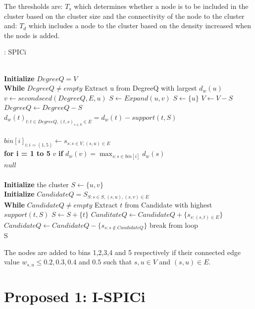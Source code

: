 \documentclass[10pt]{extarticle}
\begin{document}
	The thresholds are: $T_s$ which determines whether a node is to be included in the cluster based on the cluster size and the connectivity of the node to the cluster and: $T_d$ which includes a node to the cluster based on the density increased when the node is added.
	\begin{algorithm}
		\caption{: SPICi}\label{spicicode}
		\begin{algorithmic}[1]
			 \\
			\textbf{Initialize} $DegreeQ = V$ \\
			\textbf{While} $DegreeQ \neq empty$
			\State Extract u from DegreeQ with largest $d_w(u)$
			\State $v \gets secondseed(DegreeQ,E,u)$
			 $S \gets Expand(u,v)$
			\EndIf
			\Else 
			\State $S \gets \{u\}$
			\EndIf
			\State $V \gets V - S $
			\State $Degree Q \gets Degree Q - S$
			\State $d_w(t)_{t:t\in DegreeQ,(t,s)_{s\in S}\in E} = d_w(t) - support(t,S)$
			\EndProcedure\\
			 \\
			$bin[i]_{i:i=(1,5)} \gets s_{s:s\in V,(s,u)\in E}$ \\
			\textbf{for i = 1 to 5}
			\State \Return $v$ \textbf{if} $d_w(v)=\max_{s:s\in bin[i]}{d_w(s)}$
			\EndIf\\
			\Return $null$
			\EndProcedure\\
			\\
			\textbf{Initialize} the cluster $S \gets \{u,v\}$ \\
			\textbf{Initialize} $CandidateQ = S_{S:s\in S,(s,u),(s,v)\in E}$\\
			\textbf{While} $CandidateQ \neq empty$
			\State Extract $t$ from Candidate with highest $support(t,S)$
			\State $S\gets S+\{t\}$
			\State $CanditateQ \gets CandidateQ + \{s_{s:(s,t)\in E}\}$
			\State $CandidateQ \gets CandidateQ - \{s_{s:s\not\in CandidateQ}\}$
			\Else
			\State break from loop
			\EndIf \\
			\Return S
			\EndProcedure
		\end{algorithmic}
	\end{algorithm}
	The nodes are added to bins 1,2,3,4 and 5 respectively if their connected edge value $w_{s,u}\leq0.2,0.3,0.4$ and $0.5$ such that $s,u\in V$ and $(s,u)\in E$.
	
	
	\section{Proposed 1: I-SPICi} \label{algo:ispici}
	
\end{document}
